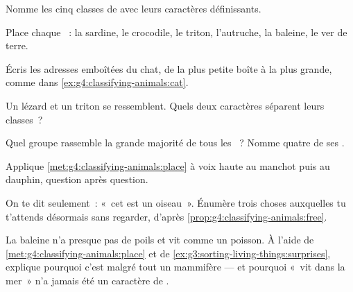 \begin{exercise}[$\star$]\label{exo:g4:classifying-animals:2}
Nomme les cinq classes de  avec leurs caractères
définissants.
\end{exercise}

\begin{exercise}[$\star$]\label{exo:g4:classifying-animals:3}
Place chaque ~: la sardine, le crocodile, le triton,
l'autruche, la baleine, le ver de terre.
\end{exercise}

\begin{exercise}[$\star$]\label{exo:g4:classifying-animals:4}
Écris les adresses emboîtées du chat, de la plus petite boîte à la
plus grande, comme dans \cref{ex:g4:classifying-animals:cat}.
\end{exercise}

\begin{exercise}[$\star$]\label{exo:g4:classifying-animals:5}
Un lézard et un triton se ressemblent. Quels deux caractères
séparent leurs classes~?
\end{exercise}

\begin{exercise}[$\star$]\label{exo:g4:classifying-animals:6}
Quel groupe rassemble la grande majorité de tous les ~? Nomme
quatre de ses .
\end{exercise}

\begin{exercise}[$\star$]\label{exo:g4:classifying-animals:7}
Applique \cref{met:g4:classifying-animals:place} à voix haute au
manchot puis au dauphin, question après question.
\end{exercise}

\begin{exercise}[$\star$]\label{exo:g4:classifying-animals:8}
On te dit seulement~: «~cet  est un oiseau~». Énumère trois
choses auxquelles tu t'attends désormais sans regarder, d'après
\cref{prop:g4:classifying-animals:free}.
\end{exercise}

\begin{exercise}[$\star\star$]\label{exo:g4:classifying-animals:9}
La baleine n'a presque pas de poils et vit comme un poisson. À
l'aide de \cref{met:g4:classifying-animals:place} et de
\cref{ex:g3:sorting-living-things:surprises}, explique pourquoi
c'est malgré tout un mammifère --- et pourquoi «~vit dans la mer~»
n'a jamais été un caractère de .
\end{exercise}

